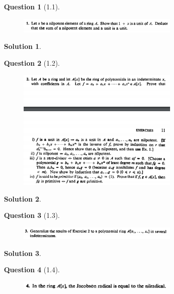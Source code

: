 \documentclass[11pt]{article}
\theoremstyle{plain}
\theoremstyle{quest}
\newtheorem*{question}{Question}
\newtheorem*{solution}{Solution}
\begin{document}
\begin{question}[1.1]
\hfill
\begin{figure}[h!]
  \centering
    \includegraphics[width=0.7\textwidth]{d-1-1.png}
\end{figure}
\end{question}
\begin{solution} \hfill \\


\end{solution}
\begin{question}[1.2]
\hfill
\begin{figure}[h!]
  \centering
    \includegraphics[width=0.7\textwidth]{d-1-2.png}
\end{figure}
\end{question}
\begin{solution} \hfill \\


\end{solution}
\begin{question}[1.3]
\hfill
\begin{figure}[h!]
  \centering
    \includegraphics[width=0.7\textwidth]{d-1-3.png}
\end{figure}
\end{question}
\begin{solution} \hfill \\


\end{solution}
\begin{question}[1.4]
\hfill
\begin{figure}[h!]
  \centering
    \includegraphics[width=0.7\textwidth]{d-1-4.png}
\end{figure}
\end{question}
\end{document}
